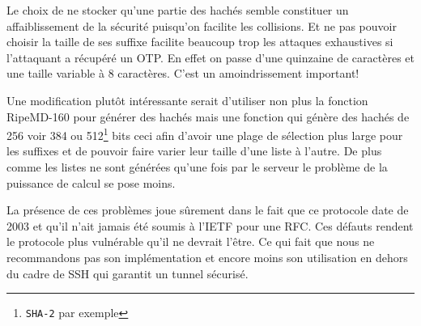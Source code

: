 \documentclass{../res/univ-projet}
\begin{document}
        Le choix de ne stocker qu'une partie des hachés semble constituer un affaiblissement de la sécurité puisqu'on facilite
    les collisions. Et ne pas pouvoir choisir la taille de ses suffixe facilite beaucoup trop les attaques exhaustives
    si l'attaquant a récupéré un OTP. En effet on passe d'une quinzaine de caractères et une taille variable à 8 caractères.
    C'est un amoindrissement important!

        Une modification plutôt intéressante serait d'utiliser non plus la fonction RipeMD-160 pour générer des hachés mais
    une fonction qui génère des hachés de 256 voir 384 ou 512\footnote{\verb?SHA-2? par exemple} bits ceci afin d'avoir une
    plage de sélection plus large pour les suffixes et de pouvoir faire varier leur taille d'une liste à l'autre.
    De plus comme les listes ne sont générées qu'une fois par le serveur le problème de la puissance de calcul se pose moins.

        La présence de ces \og problèmes \fg{} joue sûrement dans le fait que ce protocole date de 2003 et qu'il n'ait jamais été soumis à l'IETF pour une RFC. Ces défauts rendent le protocole plus vulnérable qu'il ne devrait l'être. Ce qui fait que nous ne recommandons
    pas son implémentation et encore moins son utilisation en dehors du cadre de SSH qui garantit un tunnel sécurisé.
\end{document}
